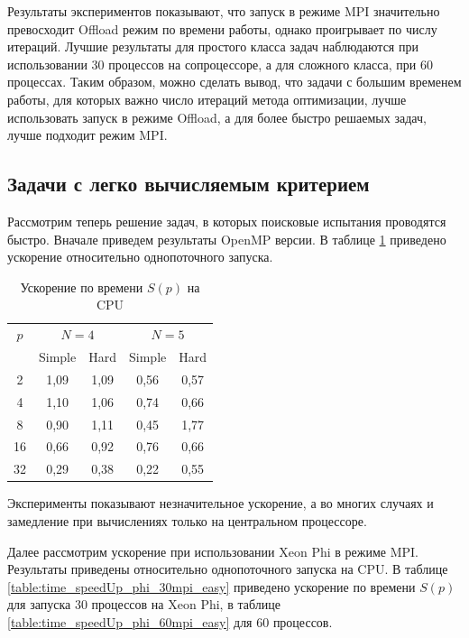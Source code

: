 \par
Результаты экспериментов показывают, что запуск в режиме MPI значительно превосходит Offload режим по времени работы, однако проигрывает по числу итераций. Лучшие результаты для простого класса задач наблюдаются при использовании 30 процессов на сопроцессоре, а для сложного класса, при 60 процессах. Таким образом, можно сделать вывод, что задачи с большим временем работы, для которых важно число итераций метода оптимизации, лучше использовать запуск в режиме Offload, а для более быстро решаемых задач, лучше подходит режим MPI. 
\subsection{Задачи с легко вычисляемым критерием}
Рассмотрим теперь решение задач, в которых поисковые испытания проводятся быстро. Вначале приведем результаты OpenMP версии. В таблице \ref{table:time_speedUp_cpu_2} приведено ускорение относительно однопоточного запуска.
\begin{table}
    \centering
    \begin{tabular}{|c|c|c|c|c|}
    \hline
    \(p\) & \multicolumn{2}{|c|}{\(N=4\)} & \multicolumn{2}{|c|}{\(N=5\)}\\ \cline{2-5}
    & Simple & Hard & Simple & Hard \\ \hline
	2 & 1,09 & 1,09 & 0,56 & 0,57 \\ \hline
	4 & 1,10 & 1,06 & 0,74 & 0,66 \\ \hline
	8 & 0,90 & 1,11 & 0,45 & 1,77 \\ \hline
	16 & 0,66 & 0,92 & 0,76 & 0,66 \\ \hline
	32 & 0,29 & 0,38 & 0,22 & 0,55 \\ \hline
    \end{tabular}
    \caption{Ускорение по времени \(S(p)\) на CPU}
    \label{table:time_speedUp_cpu_2}
\end{table}
\par
Эксперименты показывают незначительное ускорение, а во многих случаях и замедление при вычислениях только на центральном процессоре.
\par
Далее рассмотрим ускорение при использовании Xeon Phi в режиме MPI. Результаты приведены относительно однопоточного запуска на CPU. В таблице \ref{table:time_speedUp_phi_30mpi_easy} приведено ускорение по времени \(S(p)\) для запуска 30 процессов на Xeon Phi, в таблице \ref{table:time_speedUp_phi_60mpi_easy} для 60 процессов.
